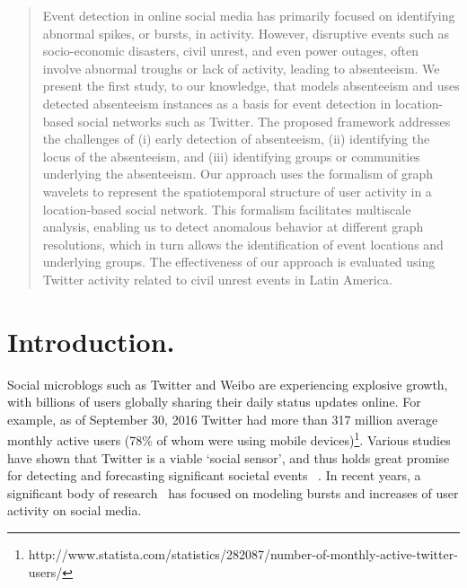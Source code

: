 \begin{abstract} \small\baselineskip=9pt Event detection in online social media has primarily focused on identifying abnormal spikes, or bursts, in activity. However, disruptive events such as socio-economic disasters, civil unrest, and even power outages, often involve abnormal troughs or lack of activity,
leading to absenteeism. We present the first study, to our knowledge, that models absenteeism and uses detected absenteeism instances as a basis for event detection in location-based social networks such as Twitter. The proposed framework addresses the challenges of (i) early detection of absenteeism, (ii) identifying the locus of the absenteeism, and (iii) identifying groups or communities underlying the absenteeism. Our approach uses the formalism of graph wavelets to represent the spatiotemporal structure of
user activity in a location-based social network. This formalism facilitates multiscale analysis, enabling us to detect anomalous behavior at different graph resolutions, which in turn allows the identification of event locations and underlying groups. The effectiveness of our approach is evaluated using Twitter activity related to civil unrest events in Latin America.\end{abstract}




\section{Introduction.}\label{sec:introduction}
Social microblogs such as Twitter and Weibo are experiencing explosive growth, with billions of users globally sharing their daily status updates online. For example, as of September 30, 2016 Twitter had more than 317 million average monthly active users (78\% of whom were using mobile devices)\footnote{http://www.statista.com/statistics/282087/number-of-monthly-active-twitter-users/}.
Various studies have shown that Twitter is a viable `social sensor', and thus holds great promise for detecting and forecasting significant societal events ~\cite{sakaki2010earthquake}.
In recent years, a significant body of research~\cite{aggarwal2012event,hong2012discovering,lappas2009burstiness,sakaki2010earthquake,sayyadi2009event,weng2011event,yin2011geographical} has focused on modeling bursts and increases of user activity on social media.

